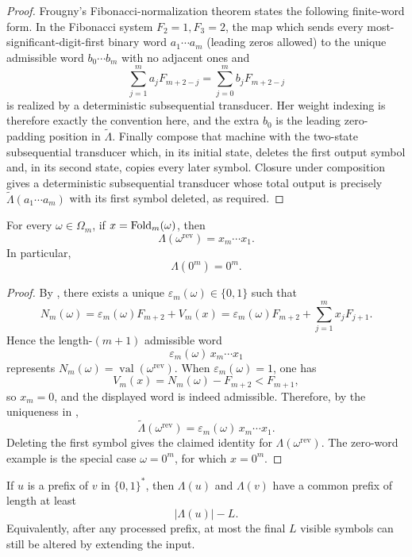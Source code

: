 \begin{proof}
Frougny's Fibonacci-normalization theorem
\cite[pp.~397--398]{Frougny1991FibonacciAutomata} states the following finite-word
form.  In the Fibonacci system \(F_2=1,F_3=2\), the map which sends every
most-significant-digit-first binary word \(a_1\cdots a_m\) (leading zeros
allowed) to the unique admissible word \(b_0\cdots b_m\) with no adjacent
ones and
\[
  \sum_{j=1}^m a_jF_{m+2-j}
  =
  \sum_{j=0}^{m} b_jF_{m+2-j}
\]
is realized by a deterministic subsequential transducer.  Her weight indexing
is therefore exactly the convention here, and the extra \(b_0\) is the leading
zero-padding position in \(\widetilde\Lambda\).  Finally compose that machine
with the two-state subsequential transducer which, in its initial state,
deletes the first output symbol and, in its second state, copies every later
symbol.  Closure under composition gives a deterministic subsequential
transducer whose total output is precisely
\(\widetilde\Lambda(a_1\cdots a_m)\) with its first symbol deleted, as required.
\end{proof}

\begin{lemma}
\label{lem:appendix-overflow-digit}
For every \(\omega\in\Omega_m\), if \(x=\mathrm{Fold}_m(\omega)\), then
\[
  \Lambda(\omega^{\mathrm{rev}})=x_m\cdots x_1.
\]
In particular,
\[
  \Lambda(0^m)=0^m.
\]
\end{lemma}

\begin{proof}
By , there exists a unique
\(\varepsilon_m(\omega)\in\{0,1\}\) such that
\[
  N_m(\omega)
  =
  \varepsilon_m(\omega)F_{m+2}+V_m(x)
  =
  \varepsilon_m(\omega)F_{m+2}+\sum_{j=1}^m x_jF_{j+1}.
\]
Hence the length-\((m+1)\) admissible word
\[
  \varepsilon_m(\omega)\,x_m\cdots x_1
\]
represents \(N_m(\omega)=\operatorname{val}(\omega^{\mathrm{rev}})\).  When
\(\varepsilon_m(\omega)=1\), one has
\[
  V_m(x)=N_m(\omega)-F_{m+2}<F_{m+1},
\]
so \(x_m=0\), and the displayed word is indeed admissible.  Therefore, by the
uniqueness in ,
\[
  \widetilde\Lambda(\omega^{\mathrm{rev}})
  =
  \varepsilon_m(\omega)\,x_m\cdots x_1.
\]
Deleting the first symbol gives the claimed identity for
\(\Lambda(\omega^{\mathrm{rev}})\).  The zero-word example is the special case
\(\omega=0^m\), for which \(x=0^m\).
\end{proof}

\begin{lemma}
\label{lem:appendix-prefix-stability}
If \(u\) is a prefix of \(v\) in \(\{0,1\}^*\), then \(\Lambda(u)\) and
\(\Lambda(v)\) have a common prefix of length at least
\[
  |\Lambda(u)|-L.
\]
Equivalently, after any processed prefix, at most the final \(L\) visible
symbols can still be altered by extending the input.
\end{lemma}


